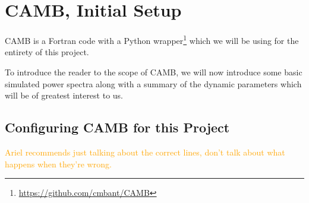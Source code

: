 \chapter{CAMB, Initial Setup}

CAMB is a Fortran code with a Python wrapper\footnote{
\url{https://github.com/cmbant/CAMB}
} which we will be using for the
entirety of this project.

To introduce the reader to the scope of CAMB, we will now introduce
some basic simulated power spectra along with a summary of the dynamic
parameters which will be of greatest interest to us.

\section{Configuring CAMB for this Project}
\label{sec: camb_config}

\begin{comment}
\textcolor{blue}{
I hope to, in painstaking detail, cover many of the lines of the code that I
have written to interface with CAMB. I will include plots to indicate, at
every step, what incorrect settings cause the power spectrum to look like (or,
for subtler errors, what the error curves looked like compared to Ariel's
results, which I treated as a sort of ``ground truth''). This should also be a
good example to flex my physics interpretation skills: why does this incorrect
setting produce this undesired pattern?}

\textcolor{blue}{You might think that this is sort of an inappropriate 
section
for a master's thesis (especially since I have in mind that this be a lengthy 
section), but I would like to include it unless you feel very strongly. After
all, I spent several months of the project debugging at least ten different 
ways that slight and major errors in the various settings led to 
irreconcilable results.}
\end{comment}

\textcolor{orange}{Ariel recommends
just talking about the correct lines, don't talk about what happens when
they're wrong.}

\begin{comment}
In figure \ref{fig: spectrum_type}, we can see that requesting of the wrong
power spectrum type can in some low-$\omega_\nu$ cases yields errors so low
that we might accidentally overlook them. This error pattern is easily
recognizable and is a consequence of the definition of the power spectrum: the
Fourier transform  of the two-point correlation function. ...Okay, I'm still 
thinking about this. I don't understand %
\end{comment}

